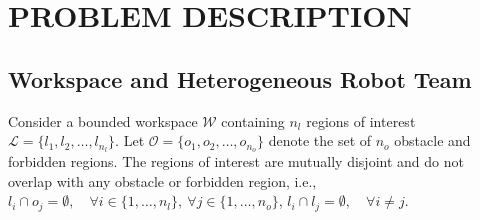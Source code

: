 \documentclass[lettersize,journal]{IEEEtran}
\theoremstyle{italiclemma}
\theoremstyle{italiclemma}
\theoremstyle{definition}
\begin{document}

\section{PROBLEM DESCRIPTION}
\label{sec:problem_description}

\subsection{Workspace and Heterogeneous Robot Team}

Consider a  bounded workspace $\mathcal{W}$ containing $n_l$ regions of interest $\mathcal{L}=\{l_1,l_2,\ldots,l_{n_l}\}$. Let $\mathcal{O}= \{o_1,o_2,\ldots,o_{n_o}\}$ denote the set of $n_o$ obstacle and forbidden regions.
The regions of interest are mutually disjoint and do not overlap with any obstacle or forbidden region, i.e., $l_i\cap o_j=\emptyset,\quad \forall i\in\{1,\ldots,n_l\},\ \forall j\in\{1,\ldots,n_o\}$, $l_i\cap l_j=\emptyset,\quad \forall i\neq j $. 
\end{document}
